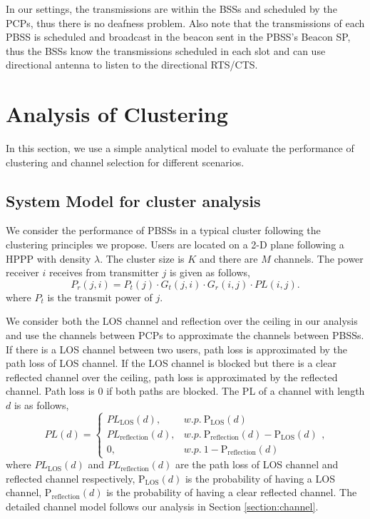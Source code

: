 \documentclass[10pt, conference, letterpaper]{IEEEtran}
\DeclareMathOperator*{\LOS}{\mathrm{LOS}}
\begin{document}
In our settings, the transmissions are within the BSSs and scheduled by the PCPs, thus there is no deafness problem. Also note that the transmissions of each PBSS is scheduled and broadcast in the beacon sent in the PBSS's Beacon SP, thus the BSSs know the transmissions scheduled in each slot and can use directional antenna to listen to the directional RTS/CTS. 


\section{Analysis of Clustering}\label{section:clusteranalysis}
In this section, we use a simple analytical model to evaluate the performance of clustering and channel selection for different scenarios.

\subsection{System Model for cluster analysis}
We consider the performance of PBSSs in a typical cluster following the clustering principles we propose. Users are located on a 2-D plane following a HPPP with density $\lambda$. The cluster size is $K$ and there are $M$ channels. 
The power receiver $i$ receives from transmitter $j$ is given as follows, 
\begin{equation*}
P_r(j,i) = P_t(j)\cdot G_t(j,i) \cdot G_r(i,j) \cdot PL(i,j).
\end{equation*} 
where $P_t$ is the transmit power of $j$.

We consider both the LOS channel and reflection over the ceiling in our analysis and use the channels between PCPs to approximate the channels between PBSSs. If there is a LOS channel between two users, path loss is approximated by the path loss of LOS channel. If the LOS channel is blocked but there is a clear reflected channel over the ceiling, path loss is approximated by the reflected channel. Path loss is 0 if both paths are blocked.
The PL of a channel with length $d$ is as follows, 
\begin{equation*}
PL(d) = 
\begin{cases}
PL_{\LOS}(d), & w.p. ~ \mathrm{P_{LOS}}(d)\\
PL_{\mathrm{reflection}}(d), & w.p. ~ \mathrm{P_{reflection}}(d) - \mathrm{P_{LOS}}(d) \\
0, & w.p. ~ 1-\mathrm{P_{reflection}}(d)
\end{cases},
\end{equation*}
where $PL_{\LOS}(d)$ and $PL_{\mathrm{reflection}}(d)$ are the path loss of LOS channel and reflected channel respectively, $\mathrm{P_{LOS}}(d)$ is the probability of having a LOS channel, $\mathrm{P_{reflection}}(d)$ is the probability of having a clear reflected channel. The detailed channel model follows our analysis in Section \ref{section:channel}. 
\end{document}
